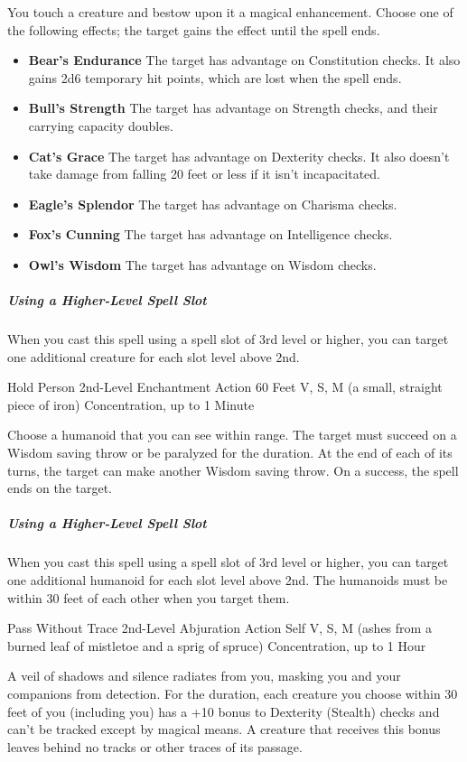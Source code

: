 \documentclass[letterpaper,openany,oneside,twocolumn]{book}
\begin{document}
You touch a creature and bestow upon it a magical enhancement. Choose one of the following effects; the target gains the effect until the spell ends.
\begin{itemize}
	\renewcommand\labelitemi{\textbf{\textbullet}}
	\item \textbf{Bear's Endurance} The target has advantage on Constitution checks. It also gains 2d6 temporary hit points, which are lost when the spell ends.
	\item \textbf{Bull's Strength} The target has advantage on Strength checks, and their carrying capacity doubles.
	\item \textbf{Cat's Grace} The target has advantage on Dexterity checks. It also doesn’t take damage from falling 20 feet or less if it isn't incapacitated.
	\item \textbf{Eagle's Splendor} The target has advantage on Charisma checks.
	\item \textbf{Fox's Cunning} The target has advantage on Intelligence checks.
	\item \textbf{Owl's Wisdom} The target has advantage on Wisdom checks.
\end{itemize}

\subparagraph*{Using a Higher-Level Spell Slot} When you cast this spell using a spell slot of 3rd level or higher, you can target one additional creature for each slot level above 2nd.

\DndSpellHeader
  {Hold Person}
  {2nd-Level Enchantment}
  {Action}
  {60 Feet}
  {V, S, M (a small, straight piece of iron)}
  {Concentration, up to 1 Minute}

Choose a humanoid that you can see within range. The target must succeed on a Wisdom saving throw or be paralyzed for the duration. At the end of each of its turns, the target can make another Wisdom saving throw. On a success, the spell ends on the target.

\subparagraph*{Using a Higher-Level Spell Slot} When you cast this spell using a spell slot of 3rd level or higher, you can target one additional humanoid for each slot level above 2nd. The humanoids must be within 30 feet of each other when you target them.

\DndSpellHeader
  {Pass Without Trace}
  {2nd-Level Abjuration}
  {Action}
  {Self}
  {V, S, M (ashes from a burned leaf of mistletoe and a sprig of spruce)}
  {Concentration, up to 1 Hour}

A veil of shadows and silence radiates from you, masking you and your companions from detection. For the duration, each creature you choose within 30 feet of you (including you) has a +10 bonus to Dexterity (Stealth) checks and can't be tracked except by magical means. A creature that receives this bonus leaves behind no tracks or other traces of its passage.
\end{document}
